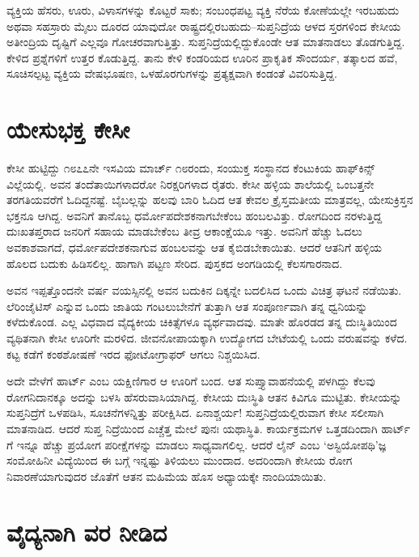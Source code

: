 ವ್ಯಕ್ತಿಯ ಹೆಸರು, ಊರು, ವಿಳಾಸಗಳನ್ನು ಕೊಟ್ಟರೆ ಸಾಕು; ಸಂಬಂಧಪಟ್ಟ ವ್ಯಕ್ತಿ ನೆರೆಯ ಕೋಣೆಯಲ್ಲೇ ಇರಬಹುದು ಅಥವಾ ಸಹಸ್ರಾರು ಮೈಲು ದೂರದ ಯಾವುದೋ ರಾಷ್ಟ್ರದಲ್ಲಿರ\-ಬಹುದು–ಸುಪ್ತನಿದ್ರೆಯ ಆಳದ ಸ್ತರಗಳಿಂದ ಕೇಸೀಯ ಅತೀಂದ್ರಿಯ ದೃಷ್ಟಿಗೆ ಎಲ್ಲವೂ ಗೋಚರ\-ವಾಗುತ್ತಿತ್ತು. ಸುಪ್ತನಿದ್ರೆಯಲ್ಲಿದ್ದುಕೊಂಡೇ ಆತ ಮಾತನಾಡಲು ತೊಡಗುತ್ತಿದ್ದ. ಕೇಳಿದ ಪ್ರಶ್ನೆಗಳಿಗೆ ಉತ್ತರ ಕೊಡುತ್ತಿದ್ದ. ತಾನು ಕೇಳಿ ಕಂಡರಿಯದ ಊರಿನ ಪ್ರಾಕೃತಿಕ ಸೌಂದರ್ಯ, ತತ್ಕಾಲದ ಹವೆ, ಸೂಚಿಸಲ್ಪಟ್ಟ ವ್ಯಕ್ತಿಯ ವೇಷಭೂಷಣ, ಒಳಹೊರಗುಗಳನ್ನು ಪ್ರತ್ಯಕ್ಷವಾಗಿ ಕಂಡಂತೆ ವಿವರಿಸುತ್ತಿದ್ದ.


\section*{ಯೇಸುಭಕ್ತ ಕೇಸೀ}


ಕೇಸೀ ಹುಟ್ಟಿದ್ದು ೧೮೭೭ನೇ ಇಸವಿಯ ಮಾರ್ಚ್ ೧೮ರಂದು, ಸಂಯುಕ್ತ ಸಂಸ್ಥಾನದ ಕೆಂಟುಕಿಯ ಹಾಫ್​ಕಿನ್ಸ್​ವಿಲ್ಲೆಯಲ್ಲಿ. ಅವನ ತಂದೆತಾಯಿಗಳಾದರೋ ನಿರಕ್ಷರಿಗಳಾದ ರೈತರು. ಕೇಸೀ ಹಳ್ಳಿಯ ಶಾಲೆಯಲ್ಲಿ ಒಂಬತ್ತನೇ ತರಗತಿಯವರೆಗೆ ಓದಿದ್ದನಷ್ಟೆ. ಬೈಬಲ್ಲನ್ನು ಹಲವು ಬಾರಿ ಓದಿದ ಆತ ಕೇವಲ ಕ್ರೈಸ್ತಮತೀಯ ಮಾತ್ರವಲ್ಲ, ಯೇಸುಕ್ರಿಸ್ತನ ಭಕ್ತನೂ ಆಗಿದ್ದ. ಅವನಿಗೆ ತಾನೊಬ್ಬ ಧರ್ಮೋಪದೇಶಕನಾಗಬೇಕೆಂಬ ಹಂಬಲವಿತ್ತು. ರೋಗದಿಂದ ನರಳುತ್ತಿದ್ದ ದುಃಖತಪ್ತರಾದ ಜನರಿಗೆ ಸಹಾಯ ಮಾಡಬೇಕೆಂಬ ತೀವ್ರ ಆಕಾಂಕ್ಷೆಯೂ ಇತ್ತು. ಅವನಿಗೆ ಹೆಚ್ಚು ಓದಲು ಅವಕಾಶವಾಗದೆ, ಧರ್ಮೋಪದೇಶಕನಾಗುವ ಹಂಬಲವನ್ನು ಆತ ಕೈಬಿಡಬೇಕಾಯಿತು. ಆದರೆ ಆತನಿಗೆ ಹಳ್ಳಿಯ ಹೊಲದ ಬದುಕು ಹಿಡಿಸಲಿಲ್ಲ. ಹಾಗಾಗಿ ಪಟ್ಟಣ ಸೇರಿದ. ಪುಸ್ತಕದ ಅಂಗಡಿಯಲ್ಲಿ ಕೆಲಸಗಾರನಾದ.

ಅವನ ಇಪ್ಪತ್ತೊಂದನೇ ವರ್ಷ ವಯಸ್ಸಿನಲ್ಲಿ ಅವನ ಬದುಕಿನ ದಿಕ್ಕನ್ನೇ ಬದಲಿಸಿದ ಒಂದು ವಿಚಿತ್ರ ಘಟನೆ ನಡೆಯಿತು. ಲೆರಿಂಜೈಟಿಸ್ ಎನ್ನುವ ಒಂದು ಜಾತಿಯ ಗಂಟಲುಬೇನೆಗೆ ತುತ್ತಾಗಿ ಆತ ಸಂಪೂರ್ಣವಾಗಿ ತನ್ನ ಧ್ವನಿಯನ್ನು ಕಳೆದುಕೊಂಡ. ಎಲ್ಲ ವಿಧವಾದ ವೈದ್ಯಕೀಯ ಚಿಕಿತ್ಸೆಗಳೂ ವ್ಯರ್ಥವಾದವು. ಮಾತೇ ಹೊರಡದ ತನ್ನ ದುಃಸ್ಥಿತಿಯಿಂದ ವ್ಯಥಿತನಾಗಿ ಕೇಸೀ ಊರಿಗೇ ಮರಳಿದ. ಜೀವನೋಪಾಯಕ್ಕಾಗಿ ಉದ್ಯೋಗದ ಬೇಟೆಯಲ್ಲಿ ಒಂದು ವರುಷವನ್ನು ಕಳೆದ. ಕಟ್ಟ ಕಡೆಗೆ ಕಂಠಶೋಷಣೆ ಇರದ ಫೋಟೋಗ್ರಾಫರ್ ಆಗಲು ನಿಶ್ಚಯಿಸಿದ.

ಅದೇ ವೇಳೆಗೆ ಹಾರ್ಟ್ ಎಂಬ ಯಕ್ಷಿಣಿಗಾರ ಆ ಊರಿಗೆ ಬಂದ. ಆತ ಸುಪ್ತ್ಯಾವಾಹನೆಯಲ್ಲಿ ಪಳಗಿದ್ದು ಕೆಲವು ರೋಗನಿದಾನಕ್ಕೂ ಅದನ್ನು ಬಳಸಿ ಹೆಸರುವಾಸಿಯಾಗಿದ್ದ. ಕೇಸೀಯ ದುಃಸ್ಥಿತಿ ಆತನ ಕಿವಿಗೂ ಮುಟ್ಟಿತು. ಕೇಸೀಯನ್ನು ಸುಪ್ತನಿದ್ರೆಗೆ ಒಳಪಡಿಸಿ, ಸೂಚನೆಗಳನ್ನಿತ್ತು ಪರೀಕ್ಷಿಸಿದ. ಏನಾಶ್ಚರ್ಯ! ಸುಪ್ತನಿದ್ರೆಯಲ್ಲಿರುವಾಗ ಕೇಸೀ ಸಲೀಸಾಗಿ ಮಾತನಾಡಿದ. ಆದರೆ ಸುಪ್ತ ನಿದ್ರೆಯಿಂದ ಎಚ್ಚೆತ್ತ ಮೇಲೆ ಪುನಃ ಯಥಾಸ್ಥಿತಿ. ಕಾರ್ಯಕ್ರಮಗಳ ಒತ್ತಡದಿಂದಾಗಿ ಹಾರ್ಟ್​ಗೆ ಇನ್ನೂ ಹೆಚ್ಚು ಪ್ರಯೋಗ ಪರೀಕ್ಷೆಗಳನ್ನು ಮಾಡಲು ಸಾಧ್ಯವಾಗಲಿಲ್ಲ. ಆದರೆ ಲೈನ್ ಎಂಬ ‘ಅಸ್ಟಿಯೋಪಥಿ’ಜ್ಞ ಸಂಮೋಹಿನೀ ವಿದ್ಯೆಯಿಂದ ಈ ಬಗ್ಗೆ ಇನ್ನಷ್ಟು ತಿಳಿಯಲು ಮುಂದಾದ. ಅದರಿಂದಾಗಿ ಕೇಸೀಯ ರೋಗ ನಿವಾರಣೆಯಾಗುವುದರ ಜೊತೆಗೆ ಆತನ ಮಹಿಮೆಯ ಹೊಸ ಅಧ್ಯಾಯಕ್ಕೇ ನಾಂದಿಯಾಯಿತು.


\section*{ವೈದ್ಯನಾಗಿ ವರ ನೀಡಿದ}

